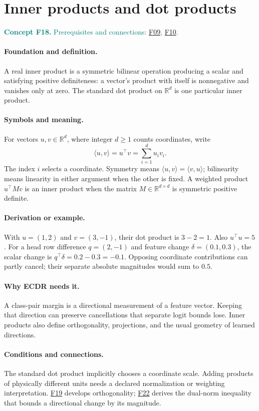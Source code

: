 \documentclass[11pt,a4paper]{article}
\newcommand{\R}{\mathbb R}
\newcommand{\conceptid}{Front matter}
\newcommand{\concept}[3]{\clearpage\renewcommand{\conceptid}{#1}%
\section{#2}\label{concept:#1}%
\textcolor{teal}{\textbf{Concept #1.} Prerequisites and connections: #3.}\par
\typeout{ECDR-CONCEPT-START #1 PAGE=\thepage}}
\begin{document}
\concept{F18}{Inner products and dot products}{\hyperref[concept:F09]{F09}, \hyperref[concept:F10]{F10}}
\paragraph{Foundation and definition.}
A real inner product is a symmetric bilinear operation producing a
scalar and satisfying positive definiteness: a vector's product with
itself is nonnegative and vanishes only at zero. The standard dot
product on $\R^d$ is one particular inner product.
\paragraph{Symbols and meaning.}
For vectors $u,v\in\R^d$, where integer $d\ge1$ counts coordinates,
write
\[
 \langle u,v\rangle=u^\top v=\sum_{i=1}^{d}u_i v_i.
\]
The index $i$ selects a coordinate. Symmetry means
$\langle u,v\rangle=\langle v,u\rangle$; bilinearity means linearity
in either argument when the other is fixed. A weighted product
$u^\top Mv$ is an inner product when the matrix
$M\in\R^{d\times d}$ is symmetric positive definite.
\paragraph{Derivation or example.}
With $u=(1,2)$ and $v=(3,-1)$, their dot product is $3-2=1$.
Also $u^\top u=5$. For a head row difference $q=(2,-1)$ and feature
change $\delta=(0.1,0.3)$, the scalar change is
$q^\top\delta=0.2-0.3=-0.1$. Opposing coordinate contributions can
partly cancel; their separate absolute magnitudes would sum to $0.5$.
\paragraph{Why ECDR needs it.}
A class-pair margin is a directional measurement of a feature vector.
Keeping that direction can preserve cancellations that separate logit
bounds lose. Inner products also define orthogonality, projections, and
the usual geometry of learned directions.
\paragraph{Conditions and connections.}
The standard dot product implicitly chooses a coordinate scale. Adding
products of physically different units needs a declared normalization
or weighting interpretation. \hyperref[concept:F19]{F19} develops orthogonality; \hyperref[concept:F22]{F22} derives the
dual-norm inequality that bounds a directional change by its magnitude.
\par\label{endconcept:F18}
\end{document}

